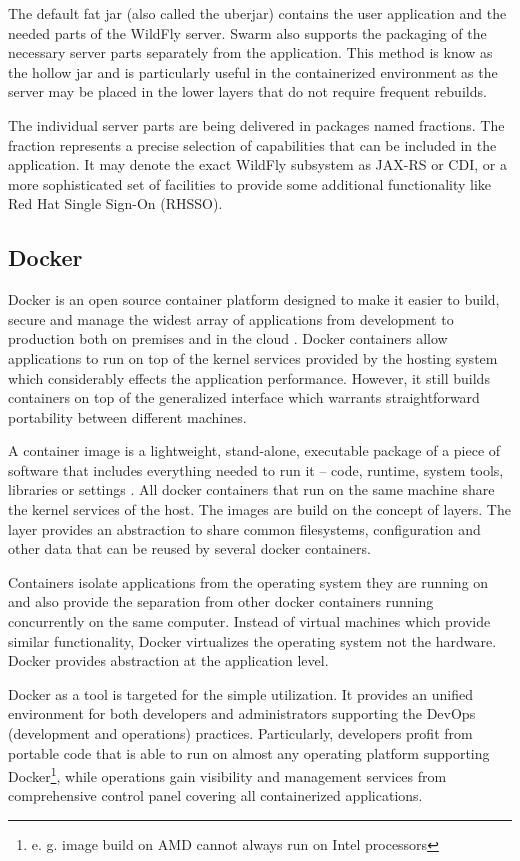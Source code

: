 \documentclass[oneside,
  digital, %
  table,   %
  lof,     %
  lot,     %
]{fithesis3}
\begin{document}
The default fat jar (also called the uberjar) contains the user application and the needed parts of the WildFly server. Swarm also supports the packaging of the necessary server parts separately from the application. This method is know as the hollow jar and is particularly useful in the containerized environment as the server may be placed in the lower layers that do not require frequent rebuilds.

The individual server parts are being delivered in packages named fractions. The fraction represents a precise selection of capabilities that can be included in the application. It may denote the exact WildFly subsystem as JAX-RS or CDI, or a more sophisticated set of facilities to provide some additional functionality like Red Hat Single Sign-On (RHSSO).

\subsection{Docker}
\label{sec:docker}

Docker is an open source container platform designed to make it easier to build, secure and manage the widest array of applications from development to production both on premises and in the cloud \cite{docker}. Docker containers allow applications to run on top of the kernel services provided by the hosting system which considerably effects the application performance. However, it still builds containers on top of the generalized interface which warrants straightforward portability between different machines.

A container image is a lightweight, stand-alone, executable package of a piece of software that includes everything needed to run it -- code, runtime, system tools, libraries or settings \cite{docker}. All docker containers that run on the same machine share the kernel services of the host. The images are build on the concept of layers. The layer provides an abstraction to share common filesystems, configuration and other data that can be reused by several docker containers.

Containers isolate applications from the operating system they are running on and also provide the separation from other docker containers running concurrently on the same computer. Instead of virtual machines which provide similar functionality, Docker virtualizes the operating system not the hardware. Docker provides abstraction at the application level.

Docker as a tool is targeted for the simple utilization. It provides an unified environment for both developers and administrators supporting the DevOps (development and operations) practices. Particularly, developers profit from portable code that is able to run on almost any operating platform supporting Docker\footnote{e. g. image build on AMD cannot always run on Intel processors}, while operations gain visibility and management services from comprehensive control panel covering all containerized applications.
\end{document}
